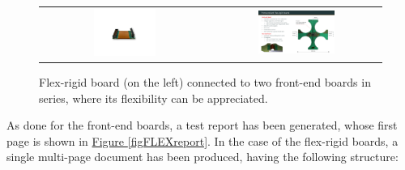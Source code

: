\begin{figure}[h!]
    \centering
    \begin{tabular}{cc}
        \includegraphics[width=0.38\textwidth]{Images/chap2/flex_rigid_pic.pdf} & \includegraphics[width=0.475\textwidth]{Images/chap2/flex_rigid_two_FEBs.pdf}\\
    \end{tabular}
    \caption{Flex-rigid board (on the left) connected to two front-end boards in series, where its flexibility can be appreciated.}
    \label{figDflexrigidPIC}
\end{figure}

\par
As done for the front-end boards, a test report has been generated, whose first page is shown in \hyperref[figFLEXreport]{Figure \ref{figFLEXreport}}. In the case of the flex-rigid boards, a single multi-page document has been produced, having the following structure:

\begin{table}[h!]
    \centering
    \def\arraystretch{2}
    \caption{Structure of the entry for the flex-rigid boards test report.}
    \label{tabFLEXstruct}
\end{table}


